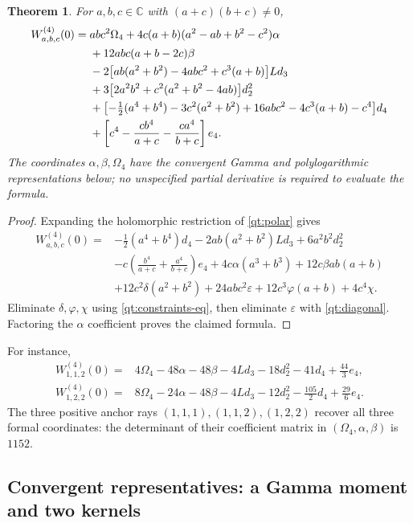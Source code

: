 \documentclass[11pt]{article}
\numberwithin{equation}{section}
\newtheorem{theorem}{Theorem}[section]
\theoremstyle{definition}
\theoremstyle{remark}
\begin{document}
\begin{theorem}\label{qt:main}
For $a,b,c\in\mathbb C$ with $(a+c)(b+c)\ne0$,
\begin{align}\label{qt:all-rays}
 W_{a,b,c}^{(4)}(0)={}&abc^2\Omega_4
 +4c(a+b)(a^2-ab+b^2-c^2)\alpha\notag\\
 &+12abc(a+b-2c)\beta\notag\\
 &-2\bigl[ab(a^2+b^2)-4abc^2+c^3(a+b)\bigr]Ld_3\notag\\
 &+3\bigl[2a^2b^2+c^2(a^2+b^2-4ab)\bigr]d_2^2\notag\\
 &+\bigl[-\tfrac12(a^4+b^4)-3c^2(a^2+b^2)
              +16abc^2-4c^3(a+b)-c^4\bigr]d_4\notag\\
 &+\left[c^4-\frac{cb^4}{a+c}-\frac{ca^4}{b+c}\right]e_4.
\end{align}
The coordinates $\alpha,\beta,\Omega_4$ have the convergent
Gamma and polylogarithmic representations below; no unspecified partial
derivative is required to evaluate the formula.
\end{theorem}
\begin{proof}
Expanding the holomorphic restriction of \eqref{qt:polar} gives
\begin{align*}
 W_{a,b,c}^{(4)}(0)={}&-\tfrac12(a^4+b^4)d_4
 -2ab(a^2+b^2)Ld_3+6a^2b^2d_2^2\\
 &-c\left(\frac{b^4}{a+c}+\frac{a^4}{b+c}\right)e_4
 +4c\alpha(a^3+b^3)+12c\beta ab(a+b)\\
 &+12c^2\delta(a^2+b^2)+24abc^2\varepsilon
 +12c^3\varphi(a+b)+4c^4\chi.
\end{align*}
Eliminate $\delta,\varphi,\chi$ using \eqref{qt:constraints-eq},
then eliminate $\varepsilon$ with \eqref{qt:diagonal}. Factoring the
$\alpha$ coefficient proves the claimed formula.
\end{proof}

For instance,
\begin{align}
 W_{1,1,2}^{(4)}(0)={}&4\Omega_4-48\alpha-48\beta-4Ld_3
                      -18d_2^2-41d_4+\tfrac{44}{3}e_4,
 \label{qt:112}\\
 W_{1,2,2}^{(4)}(0)={}&8\Omega_4-24\alpha-48\beta-4Ld_3
                      -12d_2^2-\tfrac{105}{2}d_4+\tfrac{29}{6}e_4.
 \label{qt:122}
\end{align}
The three positive anchor rays $(1,1,1),(1,1,2),(1,2,2)$ recover
all three formal coordinates: the determinant of their coefficient
matrix in $(\Omega_4,\alpha,\beta)$ is $1152$.

\subsection{Convergent representatives: a Gamma moment and two kernels}
\end{document}
